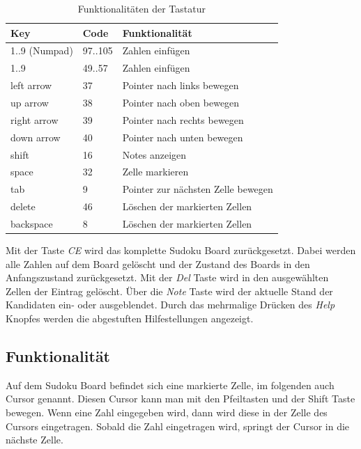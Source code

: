 \begin{table}[H]
	\centering
	\begin{tabular}{lll}
		\hline
		Key         & Code    & Funktionalität                     \\ \hline
		1..9 (Numpad)       & 97..105 & Zahlen einfügen                    \\
		1..9        & 49..57  & Zahlen einfügen                    \\
		left arrow  & 37      & Pointer nach links bewegen         \\
		up arrow    & 38      & Pointer nach oben bewegen          \\
		right arrow & 39      & Pointer nach rechts bewegen        \\
		down arrow  & 40      & Pointer nach unten bewegen         \\
		shift       & 16      & Notes anzeigen                     \\
		space       & 32      & Zelle markieren                    \\
		tab         & 9       & Pointer zur nächsten Zelle bewegen \\
		delete      & 46      & Löschen der markierten Zellen      \\
		backspace   & 8       & Löschen der markierten Zellen      \\ \hline
	\end{tabular}%
	\caption{Funktionalitäten der Tastatur}
	\label{tab:tastatur}
\end{table}

Mit der Taste \textit{\ac{CE}} wird das komplette Sudoku Board zurückgesetzt. Dabei werden alle Zahlen auf dem Board gelöscht und der Zustand des Boards in den Anfangszustand zurückgesetzt. Mit der \textit{Del} Taste wird in den ausgewählten Zellen der Eintrag gelöscht. Über die \textit{Note} Taste wird der aktuelle Stand der Kandidaten ein- oder ausgeblendet. Durch das mehrmalige Drücken des \textit{Help} Knopfes werden die abgestuften Hilfestellungen angezeigt.

\subsection{Funktionalität}
\label{sub:func}

Auf dem Sudoku Board befindet sich eine markierte Zelle, im folgenden auch Cursor genannt. Diesen Cursor kann man mit den Pfeiltasten und der Shift Taste bewegen. Wenn eine Zahl eingegeben wird, dann wird diese in der Zelle des Cursors eingetragen. Sobald die Zahl eingetragen wird, springt der Cursor in die nächste Zelle. 

